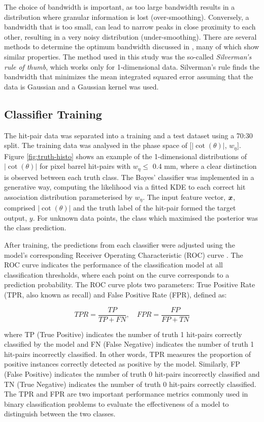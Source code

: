 The choice of bandwidth is important, as too large bandwidth results in a distribution where granular information is lost (over-smoothing). Conversely, a bandwidth that is too small, can lead to narrow peaks in close proximity to each other, resulting in a very noisy distribution (under-smoothing). There are several methods to determine the optimum bandwidth discussed in \cite{bandwidth-selection-methods}, many of which show similar properties. The method used in this study was the so-called \textit{Silverman's rule of thumb}, which works only for 1-dimensional data. Silverman's rule finds the bandwidth that minimizes the mean integrated squared error assuming that the data is Gaussian and a Gaussian kernel was used.

\newpage
\subsection{Classifier Training}

The hit-pair data was separated into a training and a test dataset using a 70:30 split. The training data was analysed in the phase space of [$|\cot(\theta)|$, $w_{\eta}$]. Figure \ref{fig:truth-histo} shows an example of the 1-dimensional distributions of $|\cot(\theta)|$ for pixel barrel hit-pairs with $w_{\eta} \le$ 0.4 mm, where a clear distinction is observed between each truth class. The Bayes’ classifier was implemented in a generative way, computing the likelihood via a fitted KDE to each correct hit association distribution parameterised by $w_{\eta}$. The input feature vector, $\textbf{\textit{x}}$, comprised $|\cot(\theta)|$ and the truth label of the hit-pair formed the target output, $\textit{y}$. For unknown data points, the class which maximised the posterior was the class prediction.

After training, the predictions from each classifier were adjusted using the model's corresponding Receiver Operating Characteristic (ROC) curve \cite{Davis2006-oh}. The ROC curve indicates the performance of the classification model at all classification thresholds, where each point on the curve corresponds to a prediction probability. The ROC curve plots two parameters: True Positive Rate (TPR, also known as recall) and False Positive Rate (FPR), defined as:  

\begin{equation}
    TPR = \frac{TP}{TP + FN}, \quad FPR = \frac{FP}{FP + TN}
\end{equation}

where TP (True Positive) indicates the number of truth 1 hit-pairs correctly classified by the model and FN (False Negative) indicates the number of truth 1 hit-pairs incorrectly classified. In other words, TPR measures the proportion of positive instances correctly detected as positive by the model. Similarly, FP (False Positive) indicates the number of truth 0 hit-pairs incorrectly classified and TN (True Negative) indicates the number of truth 0 hit-pairs correctly classified. The TPR and FPR are two important performance metrics commonly used in binary classification problems to evaluate the effectiveness of a model to distinguish between the two classes. 


